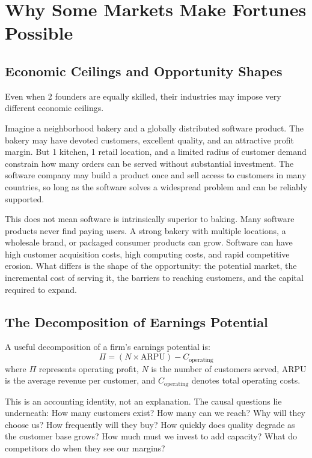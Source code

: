\section{Why Some Markets Make Fortunes Possible}

\subsection{Economic Ceilings and Opportunity Shapes}

Even when 2 founders are equally skilled, their industries may impose very different economic ceilings.

Imagine a neighborhood bakery and a globally distributed software product. The bakery may have devoted customers, excellent quality, and an attractive profit margin. But 1 kitchen, 1 retail location, and a limited radius of customer demand constrain how many orders can be served without substantial investment. The software company may build a product once and sell access to customers in many countries, so long as the software solves a widespread problem and can be reliably supported.

This does not mean software is intrinsically superior to baking. Many software products never find paying users. A strong bakery with multiple locations, a wholesale brand, or packaged consumer products can grow. Software can have high customer acquisition costs, high computing costs, and rapid competitive erosion. What differs is the shape of the opportunity: the potential market, the incremental cost of serving it, the barriers to reaching customers, and the capital required to expand.

\subsection{The Decomposition of Earnings Potential}

A useful decomposition of a firm's earnings potential is:
\begin{equation}
  \Pi = (N \times \text{ARPU}) - C_{\text{operating}} \label{eq:operating-profit}
\end{equation}
where $\Pi$ represents operating profit, $N$ is the number of customers served, $\text{ARPU}$ is the average revenue per customer, and $C_{\text{operating}}$ denotes total operating costs.

This is an accounting identity, not an explanation. The causal questions lie underneath: How many customers exist? How many can we reach? Why will they choose us? How frequently will they buy? How quickly does quality degrade as the customer base grows? How much must we invest to add capacity? What do competitors do when they see our margins?

